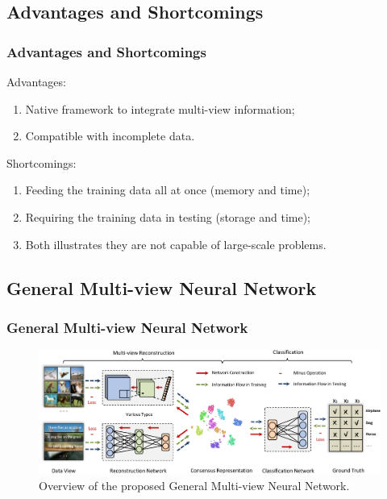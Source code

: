 \documentclass[notheorems, aspectratio=54]{beamer}
\begin{document}
\subsection{Advantages and Shortcomings}

\begin{frame} \frametitle{Advantages and Shortcomings}

Advantages:
\begin{enumerate}
  \item Native framework to integrate multi-view information;
  \item Compatible with incomplete data. \\[15pt]
\end{enumerate}

Shortcomings:
\begin{enumerate}
  \item Feeding the training data all at once (memory and time);
  \item Requiring the training data in testing (storage and time);
  \item Both illustrates they are not capable of large-scale problems.
\end{enumerate}

\end{frame}

\subsection{General Multi-view Neural Network}

\begin{frame} \frametitle{General Multi-view Neural Network}

\begin{figure}
\centering
\includegraphics[width=\textwidth]{./fig/overview_gmnet.pdf}
\caption{Overview of the proposed General Multi-view Neural Network. }
\label{fig:overview_gmnet}
\end{figure}

\end{frame}
\end{document}
